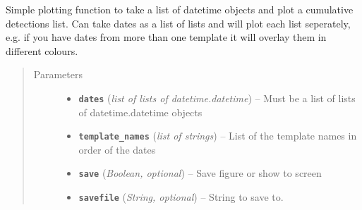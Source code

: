 \documentclass[a4paper,10pt,english]{sphinxmanual}
\begin{document}
\begin{fulllineitems}
\label{utils:EQcorrscan_plotting.cumulative_detections}
Simple plotting function to take a list of datetime objects and plot
a cumulative detections list.  Can take dates as a list of lists and will
plot each list seperately, e.g. if you have dates from more than one
template it will overlay them in different colours.
\begin{quote}\begin{description}
\item[{Parameters}] \leavevmode\begin{itemize}
\item {} 
\textbf{\texttt{dates}} (\emph{list of lists of datetime.datetime}) -- Must be a list of lists of datetime.datetime objects

\item {} 
\textbf{\texttt{template\_names}} (\emph{list of strings}) -- List of the template names in order of the dates

\item {} 
\textbf{\texttt{save}} (\emph{Boolean, optional}) -- Save figure or show to screen

\item {} 
\textbf{\texttt{savefile}} (\emph{String, optional}) -- String to save to.

\end{itemize}

\end{description}\end{quote}

\end{fulllineitems}

\end{document}
